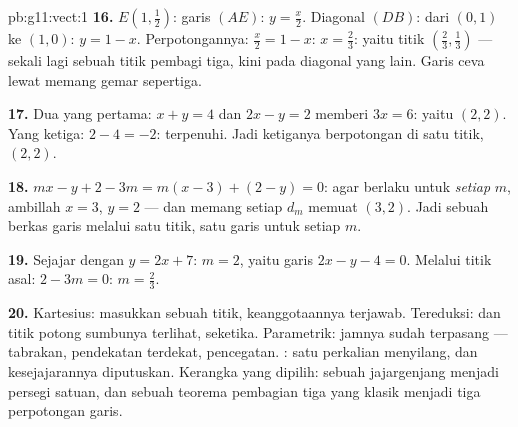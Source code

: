 \begin{solution}{pb:g11:vect:1}
\textbf{16.} $E\left(1, \frac12\right)$: garis $(AE)$:
$y = \frac x2$. Diagonal $(DB)$: dari $(0,1)$ ke $(1,0)$:
$y = 1 - x$. Perpotongannya: $\frac x2 = 1 - x$: $x = \frac23$:
yaitu titik $\left(\frac23, \frac13\right)$ --- sekali lagi sebuah
titik pembagi tiga, kini pada diagonal yang lain. Garis ceva lewat  memang gemar sepertiga.

\textbf{17.} Dua yang pertama: $x + y = 4$ dan $2x - y = 2$ memberi
$3x = 6$: yaitu $(2, 2)$. Yang ketiga: $2 - 4 = -2$: terpenuhi. Jadi
ketiganya berpotongan di satu titik, $(2, 2)$.

\textbf{18.} $mx - y + 2 - 3m = m(x - 3) + (2 - y) = 0$: agar
 berlaku untuk \emph{setiap} $m$, ambillah $x = 3$,
$y = 2$ --- dan memang setiap $d_m$ memuat $(3, 2)$. Jadi sebuah berkas
garis melalui satu titik, satu garis untuk setiap  $m$.

\textbf{19.} Sejajar dengan $y = 2x + 7$:  $m = 2$, yaitu garis
$2x - y - 4 = 0$. Melalui titik asal: $2 - 3m = 0$:
$m = \frac23$.

\textbf{20.} Kartesius: masukkan sebuah titik, keanggotaannya terjawab.
Tereduksi:  dan titik potong sumbunya terlihat,  seketika.
Parametrik: jamnya sudah terpasang --- tabrakan, pendekatan
terdekat, pencegatan. : satu perkalian
menyilang, dan kesejajarannya diputuskan. Kerangka yang dipilih: sebuah
jajargenjang menjadi persegi satuan, dan sebuah teorema pembagian tiga yang
klasik menjadi tiga perpotongan garis.

\end{solution}
